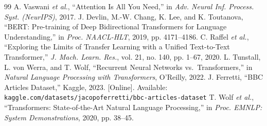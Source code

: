 \documentclass[letterpaper, 10 pt, conference]{ieeeconf}
\begin{document}
\begin{thebibliography}{99}
 A. Vaswani \emph{et al.}, ``Attention Is All You Need,'' in \emph{Adv. Neural Inf. Process. Syst. (NeurIPS)}, 2017.
 J. Devlin, M.-W. Chang, K. Lee, and K. Toutanova, ``BERT: Pre-training of Deep Bidirectional Transformers for Language Understanding,'' in \emph{Proc. NAACL-HLT}, 2019, pp. 4171--4186.
 C. Raffel \emph{et al.}, ``Exploring the Limits of Transfer Learning with a Unified Text-to-Text Transformer,'' \emph{J. Mach. Learn. Res.}, vol. 21, no. 140, pp. 1--67, 2020.
 L. Tunstall, L. von Werra, and T. Wolf, ``Recurrent Neural Networks vs.\ Transformers,'' in \emph{Natural Language Processing with Transformers}, O'Reilly, 2022.
 J. Ferretti, ``BBC Articles Dataset,'' Kaggle, 2023. [Online]. Available: \texttt{kaggle.com/datasets/jacopoferretti/bbc-articles-dataset}
 T. Wolf \emph{et al.}, ``Transformers: State-of-the-Art Natural Language Processing,'' in \emph{Proc. EMNLP: System Demonstrations}, 2020, pp. 38--45.
\end{thebibliography}
\end{document}
